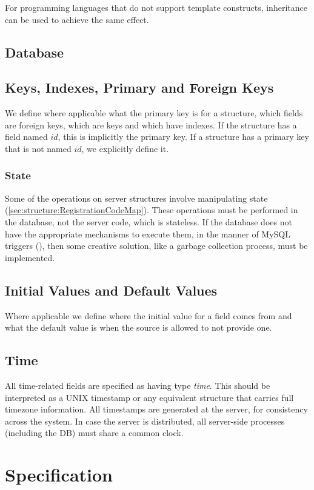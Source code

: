 \documentclass[a4paper,10pt]{article}
\begin{document}
For programming languages that do not support template constructs, inheritance can be used to achieve the same effect.

\subsection{Database}

\subsection{Keys, Indexes, Primary and Foreign Keys}
We define where applicable what the primary key is for a structure, which fields are foreign keys, which are keys and which have indexes. If the structure has a field named $id$, 
this is implicitly the primary key. If a structure has a primary key that is not named $id$, we explicitly define it.

\subsubsection{State}
Some of the operations on server structures involve manipulating state (\ref{sec:structure:RegistrationCodeMap}). These operations must be performed in the database, not the 
server code, which is stateless. If the database does not have the appropriate mechanisms to execute them, in the manner of MySQL triggers (\cite{mysql_trigger}), then some 
creative solution, like a garbage collection process, must be implemented.

\subsection{Initial Values and Default Values}
Where applicable we define where the initial value for a field comes from and what the default value is when the source is allowed to not provide one.

\subsection{Time}
All time-related fields are specified as having type {\em time}. This should be interpreted as a UNIX timestamp or any equivalent structure that carries full timezone information. 
All timestamps are generated at the server, for consistency across the system. In case the server is distributed, all server-side processes (including the DB) must share a common 
clock.

\section{Specification}
\end{document}
